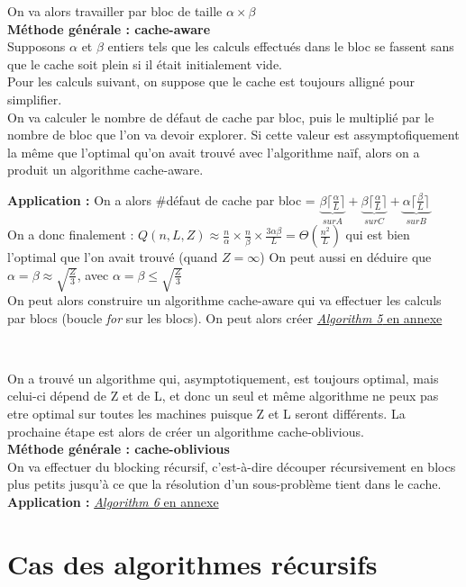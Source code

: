 \documentclass[
  paper=a4,
  ,captions=tableheading
]{scrartcl}
\begin{document}
On va alors travailler par bloc de taille \(\alpha \times \beta\)\\
\textbf{Méthode générale : cache-aware}\\
Supposons \(\alpha\) et \(\beta\) entiers tels que les calculs effectués
dans le bloc se fassent sans que le cache soit plein si il était
initialement vide.\\
Pour les calculs suivant, on suppose que le cache est toujours alligné
pour simplifier.\\
On va calculer le nombre de défaut de cache par bloc, puis le multiplié
par le nombre de bloc que l'on va devoir explorer. Si cette valeur est
assymptofiquement la même que l'optimal qu'on avait trouvé avec
l'algorithme naïf, alors on a produit un algorithme cache-aware.

\textbf{Application :} On a alors \#défaut de cache par bloc =
\(\underbrace{ \beta\lceil \frac{\alpha}{L}\rceil}_{sur A}+ \underbrace{\beta\lceil \frac{\alpha}{L}\rceil}_{sur C} + \underbrace{ \alpha\lceil \frac{\beta}{L}\rceil}_{sur B}\)\\
On a donc finalement :
\(Q(n,L,Z) \approx \frac{n}{\alpha} \times \frac{n}{\beta} \times \frac{3 \alpha\beta}{L} = \Theta(\frac{n^2}{L})\)
qui est bien l'optimal que l'on avait trouvé (quand \(Z = \infty\)) On
peut aussi en déduire que \(\alpha = \beta \approx \sqrt{\frac{Z}{3}}\),
avec \(\alpha = \beta \leq \sqrt{\frac{Z}{3}}\)\\
On peut alors construire un algorithme cache-aware qui va effectuer les
calculs par blocs (boucle \emph{for} sur les blocs). On peut alors créer
\protect\hyperlink{algorithm5}{\emph{Algorithm 5} en annexe}

~

On a trouvé un algorithme qui, asymptotiquement, est toujours optimal,
mais celui-ci dépend de Z et de L, et donc un seul et même algorithme ne
peux pas etre optimal sur toutes les machines puisque Z et L seront
différents. La prochaine étape est alors de créer un algorithme
cache-oblivious.\\
\textbf{Méthode générale : cache-oblivious}\\
On va effectuer du blocking récursif, c'est-à-dire découper
récursivement en blocs plus petits jusqu'à ce que la résolution d'un
sous-problème tient dans le cache.\\
\textbf{Application :} \protect\hyperlink{algorithm6}{\emph{Algorithm 6}
en annexe}

\hypertarget{cas-des-algorithmes-ruxe9cursifs}{%
\section{Cas des algorithmes
récursifs}\label{cas-des-algorithmes-ruxe9cursifs}}
\end{document}
